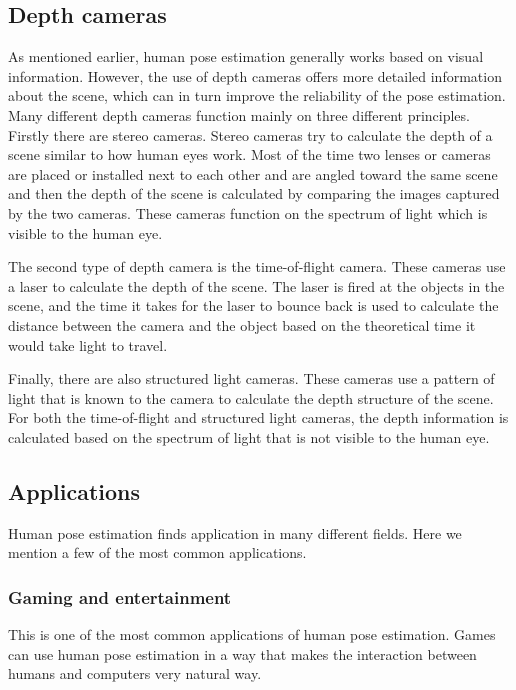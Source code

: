 \subsection{Depth cameras}

As mentioned earlier, human pose estimation generally works based on visual information. However, the use of depth cameras offers more detailed information about the scene, which can in turn improve the reliability of the pose estimation. Many different depth cameras function mainly on three different principles. Firstly there are stereo cameras. Stereo cameras try to calculate the depth of a scene similar to how human eyes work. Most of the time two lenses or cameras are placed or installed next to each other and are angled toward the same scene and then the depth of the scene is calculated by comparing the images captured by the two cameras. These cameras function on the spectrum of light which is visible to the human eye. 

The second type of depth camera is the time-of-flight camera. These cameras use a laser to calculate the depth of the scene. The laser is fired at the objects in the scene, and the time it takes for the laser to bounce back is used to calculate the distance between the camera and the object based on the theoretical time it would take light to travel. 

Finally, there are also structured light cameras. These cameras use a pattern of light that is known to the camera to calculate the depth structure of the scene. For both the time-of-flight and structured light cameras, the depth information is calculated based on the spectrum of light that is not visible to the human eye.

\subsection{Applications}

Human pose estimation finds application in many different fields. Here we mention a few of the most common applications.

\subsubsection{Gaming and entertainment}

This is one of the most common applications of human pose estimation. Games can use human pose estimation in a way that makes the interaction between humans and computers very natural way.

